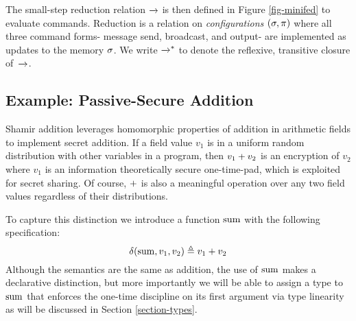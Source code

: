 The small-step reduction relation $\xrightarrow{}$ is then defined in Figure
\ref{fig-minifed} to evaluate commands. Reduction is a relation on
\emph{configurations} $(\sigma, \pi)$ where all three command forms-
message send, broadcast, and output- are implemented as updates to the
memory $\sigma$. We write $\xrightarrow{}^{*}$ to denote the reflexive, transitive
closure of\ $\xrightarrow{}$. 

\subsection{Example: Passive-Secure Addition}

Shamir addition leverages homomorphic properties of addition in
arithmetic fields to implement secret addition. If a field value $v_1$
is in a uniform random distribution with other variables in a program,
then $v_1 + v_2$ is an encryption of $v_2$ where $v_1$ is an
information theoretically secure one-time-pad, which is exploited for
secret sharing. Of course, $+$ is also a meaningful operation
over any two field values regardless of their distributions.

To capture this distinction we introduce a function $\mathrm{sum}$
with the following specification:
$$
\delta(\mathrm{sum},v_1,v_2) \triangleq v_1 + v_2
$$
Although the semantics are the same as addition, the use of $\mathrm{sum}$
makes a declarative distinction, but more importantly we will be
able to assign a type to $\mathrm{sum}$ that enforces the one-time discipline
on its first argument via type linearity as will be discussed in Section
\ref{section-types}.

